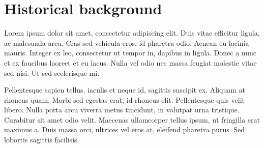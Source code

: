 \section{Historical background}
Lorem ipsum dolor sit amet, consectetur adipiscing elit. Duis vitae efficitur ligula, ac malesuada arcu. Cras sed vehicula eros, id pharetra odio. Aenean eu lacinia mauris. Integer ex leo, consectetur ut tempor in, dapibus in ligula. Donec a nunc et ex faucibus laoreet et eu lacus. Nulla vel odio nec massa feugiat molestie vitae sed nisi. Ut sed scelerisque mi.

Pellentesque sapien tellus, iaculis et neque id, sagittis suscipit ex. Aliquam at rhoncus quam. Morbi sed egestas erat, id rhoncus elit. Pellentesque quis velit libero. Nulla porta arcu viverra metus tincidunt, in volutpat urna tristique. Curabitur sit amet odio velit. Maecenas ullamcorper tellus ipsum, ut fringilla erat maximus a. Duis massa orci, ultrices vel eros at, eleifend pharetra purus. Sed lobortis sagittis facilisis.
